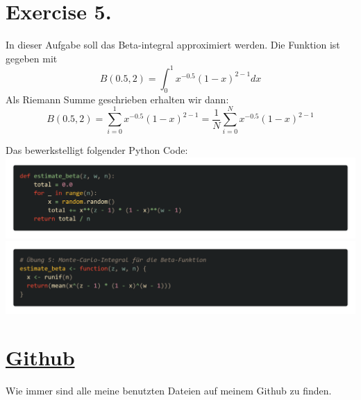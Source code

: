 \documentclass{scrartcl}
\begin{document}
\section*{Exercise 5.}
In dieser Aufgabe soll das Beta-integral approximiert werden. Die Funktion ist gegeben mit
$$B(0.5,2) = \int_{0}^{1} x^{-0.5}(1-x)^{2-1}dx$$
Als Riemann Summe geschrieben erhalten wir dann:
$$B(0.5,2)= \sum_{i=0}^{1} x^{-0.5}(1-x)^{2-1} = \frac1N \sum_{i=0}^{N} x^{-0.5}(1-x)^{2-1} $$

Das bewerkstelligt folgender Python Code:\\
\includegraphics*[scale=0.24]{estimate_beta_py.png}\\
\includegraphics*[scale=0.24]{estimate_beta_R.png}


\section*{\href{https://github.com/7hands/Angewandte-Modellierung-25-Colmant}{Github}}
Wie immer sind alle meine benutzten Dateien auf meinem Github zu finden. 
\end{document}
